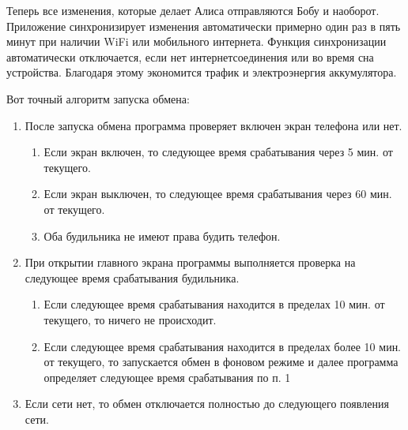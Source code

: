 \documentclass[a4paper,10pt,russian]{sphinxmanual}
\begin{document}
\noindent{}
\noindent{}
\noindent{}
\noindent{}

\sphinxAtStartPar
Теперь все изменения, которые делает Алиса отправляются Бобу и наоборот. Приложение синхронизирует изменения
автоматически примерно один раз в пять минут при наличии Wi\sphinxhyphen{}Fi или мобильного интернета. Функция синхронизации
автоматически отключается, если нет интернет\sphinxhyphen{}соединения или во время сна устройства. Благодаря этому
экономится трафик и электроэнергия аккумулятора.

\sphinxAtStartPar
Вот точный алгоритм запуска обмена:
\begin{enumerate}
%
\item {} 
\sphinxAtStartPar
После запуска обмена программа проверяет включен экран телефона или нет.
\begin{enumerate}
%
\item {} 
\sphinxAtStartPar
Если экран включен, то следующее время срабатывания \sphinxhyphen{} через 5 мин. от текущего.

\item {} 
\sphinxAtStartPar
Если экран выключен, то следующее время срабатывания \sphinxhyphen{} через 60 мин. от текущего.

\item {} 
\sphinxAtStartPar
Оба будильника не имеют права будить телефон.

\end{enumerate}

\item {} 
\sphinxAtStartPar
При открытии главного экрана программы выполняется проверка на следующее время срабатывания будильника.
\begin{enumerate}
%
\item {} 
\sphinxAtStartPar
Если следующее время срабатывания находится в пределах 10 мин. от текущего, то ничего не происходит.

\item {} 
\sphinxAtStartPar
Если следующее время срабатывания находится в пределах более 10 мин. от текущего, то запускается обмен в фоновом режиме и далее программа определяет следующее время срабатывания по п. 1

\end{enumerate}

\item {} 
\sphinxAtStartPar
Если сети нет, то обмен отключается полностью до следующего появления сети.

\end{enumerate}
\end{document}
